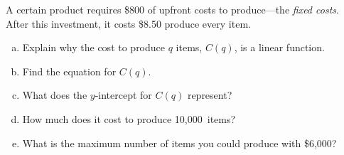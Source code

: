 \documentclass[11pt,letterpaper]{article}
\begin{document}
\newpage



 A certain product requires \$800 of upfront costs to produce---the \textit{fixed costs}. After this investment, it costs \$8.50 produce every item. 
	\begin{enumerate}[(a)]
	\item Explain why the cost to produce $q$ items, $C(q)$, is a linear function.
	\item Find the equation for $C(q)$.
	\item What does the $y$-intercept for $C(q)$ represent?
	\item How much does it cost to produce 10,000~items?
	\item What is the maximum number of items you could produce with \$6,000?
	\end{enumerate}
\end{document}
